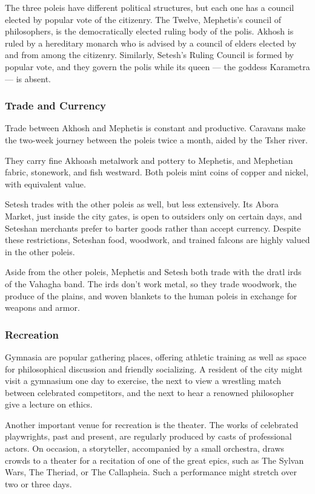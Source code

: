 The three poleis have different political structures, but each one has a council elected by popular vote of the citizenry.
The Twelve, Mephetis's council of philosophers, is the democratically elected ruling body of the polis.
Akhosh is ruled by a hereditary monarch who is advised by a council of elders elected by and from among the citizenry.
Similarly, Setesh's Ruling Council is formed by popular vote, and they govern the polis while its queen --- the goddess Karametra --- is absent.

\subsubsection{Trade and Currency}
Trade between Akhosh and Mephetis is constant and productive.
Caravans make the two-week journey between the poleis twice a month, aided by the Tsher river.

\newpage

They carry fine Akhoash metalwork and pottery to Mephetis, and Mephetian fabric, stonework, and fish westward.
Both poleis mint coins of copper and nickel, with equivalent value.

Setesh trades with the other poleis as well, but less extensively.
Its Abora Market, just inside the city gates, is open to outsiders only on certain days, and Seteshan merchants prefer to barter goods rather than accept currency.
Despite these restrictions, Seteshan food, woodwork, and trained falcons are highly valued in the other poleis.

Aside from the other poleis, Mephetis and Setesh both trade with the dratl irds of the Vahagha band.
The irds don't work metal, so they trade woodwork, the produce of the plains, and woven blankets to the human poleis in exchange for weapons and armor.

\subsubsection{Recreation}

Gymnasia are popular gathering places, offering athletic training as well as space for philosophical discussion and friendly socializing.
A resident of the city might visit a gymnasium one day to exercise, the next to view a wrestling match between celebrated competitors, and the next to hear a renowned philosopher give a lecture on ethics.

Another important venue for recreation is the theater.
The works of celebrated playwrights, past and present, are regularly produced by casts of professional actors.
On occasion, a storyteller, accompanied by a small orchestra, draws crowds to a theater for a recitation of one of the great epics, such as The Sylvan Wars, The Theriad, or The Callapheia.
Such a performance might stretch over two or three days.

